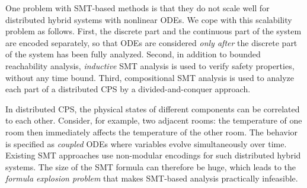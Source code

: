 One problem with  SMT-based methods is 
that they do not scale well for distributed hybrid systems with nonlinear ODEs.
We cope with this scalability problem as follows.
First, the discrete part and the continuous part of the system are
encoded separately, 
so that ODEs are considered \emph{only after} the discrete part of the
system has been  fully analyzed.
Second, in addition to bounded reachability analysis, \emph{inductive}
SMT analysis is used to verify safety properties,  without any time
bound. 
Third, compositional SMT analysis is used to analyze each part of a
distributed CPS by a divided-and-conquer approach. %



In distributed CPS, the 
physical states of different components can be  correlated to each other.
Consider, for example,  two adjacent rooms: the temperature of one room then immediately affects the
temperature of the other room. %
The behavior is specified as \emph{coupled} ODEs
where variables evolve simultaneously over  time.
Existing SMT approaches use  non-modular encodings
for such distributed hybrid systems. 
%
The size of the SMT formula can therefore be huge, which 
 leads to the \emph{formula explosion problem}
that makes  SMT-based analysis practically infeasible.


